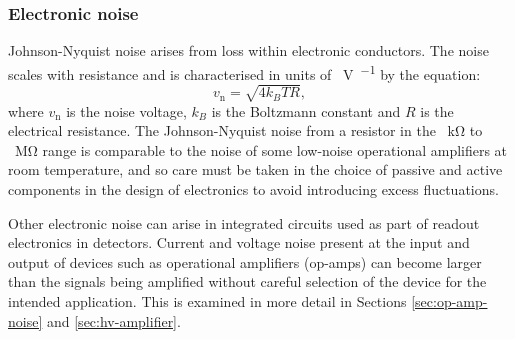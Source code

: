 \subsubsection{\label{sec:johnson-nyquist-noise}Electronic noise}
Johnson-Nyquist noise arises from loss within electronic conductors. The noise scales with resistance and is characterised in units of \SI{}{\volt\per\sqrthz} by the equation:
\begin{equation}
  v_{\text{n}} = \sqrt{4 k_B T R},
\end{equation}
where $v_{\text{n}}$ is the noise voltage, $k_B$ is the Boltzmann constant and $R$ is the electrical resistance. The Johnson-Nyquist noise from a resistor in the \SI{}{\kilo\ohm} to \SI{}{\mega\ohm} range is comparable to the noise of some low-noise operational amplifiers at room temperature, and so care must be taken in the choice of passive and active components in the design of electronics to avoid introducing excess fluctuations.

Other electronic noise can arise in integrated circuits used as part of readout electronics in detectors. Current and voltage noise present at the input and output of devices such as operational amplifiers (op-amps) can become larger than the signals being amplified without careful selection of the device for the intended application. This is examined in more detail in Sections \ref{sec:op-amp-noise} and \ref{sec:hv-amplifier}.

